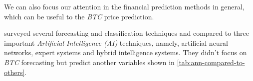 
We can also focus our attention in the financial prediction methods in
general, which can be useful to the \textit{BTC} price prediction.

\cite{bahrammirzaee2010comparative} surveyed several forecasting and
classification techniques and compared to three important
\textit{Artificial Intelligence (AI)} techniques, namely, artificial
neural networks, expert systems and hybrid intelligence systems. They
didn't focus on \textit{BTC} forecasting but predict another variables
shown in \autoref{tab:ann-compared-to-others}.

